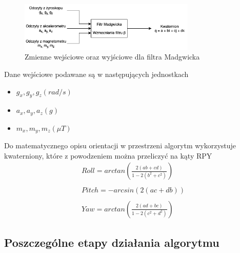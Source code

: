 \begin{figure}[h!]
    \centering
    \includegraphics[width=0.75\textwidth]{Rysunki/Rozdzial04/Madgwick_idea.png}
    \caption{Zmienne wejściowe oraz wyjściowe dla filtra Madgwicka}
    \label{Madgwick idea}
\end{figure}

Dane wejściowe podawane są w następujących jednostkach
\begin{itemize}
    \item $g_x, g_y, g_z (rad/s)$
    \item $a_x, a_y, a_z (g)$
    \item $m_x, m_y, m_z (\mu T)$
\end{itemize}

Do matematycznego opisu orientacji w przestrzeni algorytm wykorzystuje kwaterniony, które z powodzeniem można przeliczyć na kąty RPY
$$
    \begin{array}{l}
        Roll = arctan\left(\frac{2(ab + cd)}{1 - 2(b^2 + c^2)}\right) \\ \\
        Pitch = -arcsin(2(ac + db)) \\ \\
        Yaw = arctan\left(\frac{2(ad + bc)}{1 - 2(c^2 + d^2)}\right) 
    \end{array}
$$

\subsection{Poszczególne etapy działania algorytmu}

